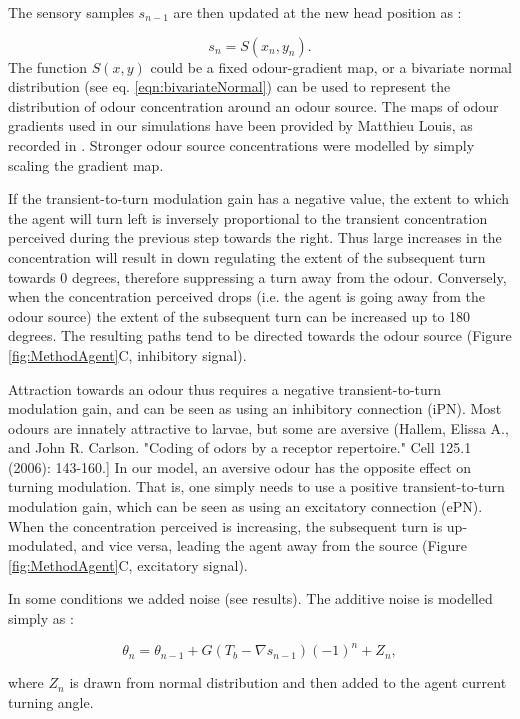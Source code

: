 \documentclass[11pt,a4paper]{article}
\begin{document}
The sensory samples $s_{n-1}$ are then updated at the new head position as :

\begin{equation}
s_n = S(x_n,y_n).
\end{equation}
The function $S(x,y)$ could be a  fixed odour-gradient map, or a bivariate normal distribution (see eq. \eqref{eqn:bivariateNormal}) can be used to represent the distribution of odour concentration around an odour source. 
 The maps of odour gradients used in our simulations have been provided by Matthieu Louis, as recorded in \citep{gomez2014multilevel}. Stronger odour source concentrations were modelled by simply scaling the gradient map. 


If the transient-to-turn modulation gain has a negative value, the extent to which the agent will turn left is inversely proportional to the transient concentration perceived during the previous step towards the right. Thus large increases in the concentration will result in down regulating the extent of the subsequent turn towards 0 degrees, therefore suppressing a turn away from the odour. Conversely, when the concentration perceived drops (i.e. the agent is going away from the odour source) the extent of the subsequent turn can be increased up to 180 degrees. The resulting paths tend to be directed towards the odour source (Figure \ref{fig:MethodAgent}C, inhibitory signal). 

Attraction towards an odour thus requires a negative transient-to-turn modulation gain, and can be seen as using an inhibitory connection (iPN).  Most odours are innately attractive to larvae, but some are aversive (Hallem, Elissa A., and John R. Carlson. "Coding of odors by a receptor repertoire." Cell 125.1 (2006): 143-160.] In our model, an aversive odour has the opposite effect on turning modulation. That is, one simply needs to use a positive transient-to-turn modulation gain, which can be seen as using an excitatory connection (ePN). When the concentration perceived is increasing, the subsequent turn is up-modulated, and vice versa, leading the agent away from the source (Figure \ref{fig:MethodAgent}C, excitatory signal).

In some conditions we added noise (see results). The additive noise is modelled simply as :

\begin{equation}
\theta_n = \theta_{n-1} + G (T_b - \nabla s_{n-1})(-1)^n + Z_n,
\end{equation}

where $Z_n$ is drawn from normal distribution and then added to the agent current turning angle. 
 
\end{document}
